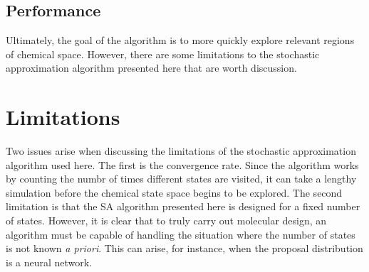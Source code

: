 \subsection{Performance}
%
Ultimately, the goal of the algorithm is to more quickly explore relevant regions of chemical space.
%
However, there are some limitations to the stochastic approximation algorithm presented here that are worth discussion.
%
\section{Limitations}
%
Two issues arise when discussing the limitations of the stochastic approximation algorithm used here.
%
The first is the convergence rate. Since the algorithm works by counting the numbr of times different states are visited, it can take a lengthy simulation before the chemical state space begins to be explored.
%
The second limitation is that the SA algorithm presented here is designed for a fixed number of states.
%
However, it is clear that to truly carry out molecular design, an algorithm must be capable of handling the situation where the number of states is not known \emph{a priori}.
%
This can arise, for instance, when the proposal distribution is a neural network.
%

